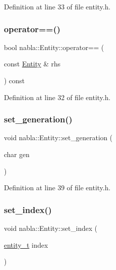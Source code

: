 Definition at line 33 of file entity.\+h.

\mbox{\label{structnabla_1_1_entity_a7c9daf8724739c429a2c22c7fa271a31}} 
\subsubsection{\texorpdfstring{operator==()}{operator==()}}
{\footnotesize\ttfamily bool nabla\+::\+Entity\+::operator== (\begin{DoxyParamCaption}\item[{const \mbox{\hyperlink{structnabla_1_1_entity}{Entity}} \&}]{rhs }\end{DoxyParamCaption}) const\hspace{0.3cm}{\ttfamily [inline]}}



Definition at line 32 of file entity.\+h.

\mbox{\label{structnabla_1_1_entity_ac93adb2a92a18f6f8a5d3ecf6844c317}} 
\subsubsection{\texorpdfstring{set\_generation()}{set\_generation()}}
{\footnotesize\ttfamily void nabla\+::\+Entity\+::set\+\_\+generation (\begin{DoxyParamCaption}\item[{char}]{gen }\end{DoxyParamCaption})\hspace{0.3cm}{\ttfamily [inline]}}



Definition at line 39 of file entity.\+h.

\mbox{\label{structnabla_1_1_entity_a853114bf954cd6fed1cff037edfe74a2}} 
\subsubsection{\texorpdfstring{set\_index()}{set\_index()}}
{\footnotesize\ttfamily void nabla\+::\+Entity\+::set\+\_\+index (\begin{DoxyParamCaption}\item[{\mbox{\hyperlink{structnabla_1_1_entity_a0e7d5826cda759dfeb3a81c8175f3b4d}{entity\+\_\+t}}}]{index }\end{DoxyParamCaption})\hspace{0.3cm}{\ttfamily [inline]}}



